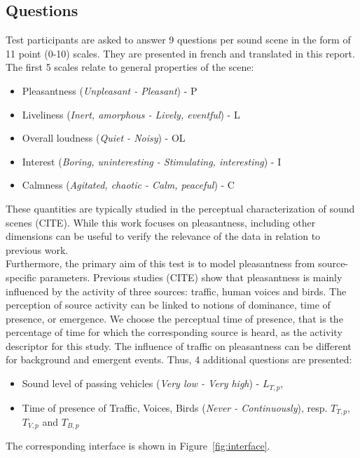 \documentclass[11pt,a4paper]{article}
\begin{document}
\subsection{Questions}

Test participants are asked to answer 9 questions per sound scene in the form of 11 point (0-10) scales. They are presented in french and translated in this report. The first 5 scales relate to general properties of the scene:
\begin{itemize}
\item Pleasantness (\textit{Unpleasant - Pleasant}) - P
\item Liveliness (\textit{Inert, amorphous - Lively, eventful}) - L
\item Overall loudness (\textit{Quiet - Noisy}) - OL
\item Interest (\textit{Boring, uninteresting - Stimulating, interesting}) - I
\item Calmness (\textit{Agitated, chaotic - Calm, peaceful}) - C
\end{itemize}
These quantities are typically studied in the perceptual characterization of sound scenes (CITE). While this work focuses on pleasantness, including other dimensions can be useful to verify the relevance of the data in relation to previous work.\\
Furthermore, the primary aim of this test is to model pleasantness from source-specific parameters. Previous studies (CITE) show that pleasantness is mainly influenced by the activity of three sources: traffic, human voices and birds. The perception of source activity can be linked to notions of dominance, time of presence,  or emergence. We choose the perceptual time of presence, that is the percentage of time for which the corresponding source is heard, as the activity descriptor for this study. The influence of traffic on pleasantness can be different for background and emergent events. Thus, 4 additional questions are presented:
\begin{itemize}
\item Sound level of passing vehicles (\textit{Very low - Very high}) - $L_{T, p}$,
\item Time of presence of Traffic, Voices, Birds (\textit{Never - Continuously}), resp. $T_{T, p}$, $T_{V, p}$ and $T_{B, p}$
\end{itemize}
The corresponding interface is shown in Figure~\ref{fig:interface}.
\end{document}
